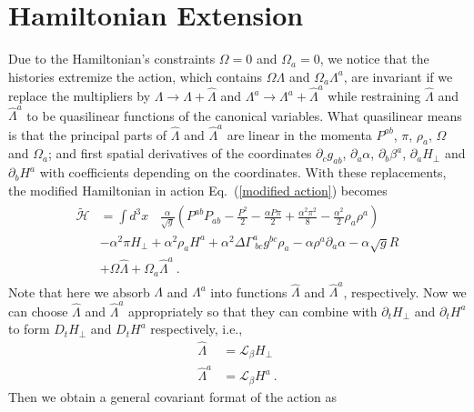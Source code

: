 \section{Hamiltonian Extension}\label{extension}
Due to the Hamiltonian's constraints $\Omega = 0$ and $\Omega_{a} = 0$, we notice that the histories extremize the action, which contains $\Omega \Lambda$ and $\Omega_{a}\Lambda^{a}$, are invariant if we replace the multipliers by $\Lambda \rightarrow \Lambda + {\hat \Lambda}$ and $\Lambda^{a} \rightarrow \Lambda^{a} + {\hat \Lambda}^{a}$ while restraining ${\hat \Lambda}$ and ${\hat \Lambda}^{a}$ to be quasilinear functions of the canonical variables. What quasilinear means is that the principal parts of ${\hat \Lambda}$ and ${\hat \Lambda}^{a}$ are linear in the momenta $P^{ab}$, $\pi$, $\rho_{a}$, $\Omega$ and $\Omega_{a}$; and first spatial derivatives of the coordinates $\partial_{c}g_{ab}$, $\partial_{a}\alpha$, $\partial_{b}\beta^{a}$, $\partial_{a}H_{\perp}$ and $\partial_{b}H^{a}$ with coefficients depending on the coordinates. With these replacements, the modified Hamiltonian in action Eq.~(\ref{modified action}) becomes
\begin{align}
\begin{split}
\tilde{\mathscr{H}} & = \int d^{3}x~~~~\frac{\alpha}{\sqrt{g}}\left(P^{ab}P_{ab} - \frac{P^{2}}{2} - \frac{\alpha P \pi}{2} + \frac{\alpha^{2}\pi^{2}}{8} - \frac{\alpha^{2}}{2}\rho_{a}\rho^{a}\right)\\
& -\alpha^{2}\pi H_{\perp} + \alpha^{2}\rho_{a}H^{a} + \alpha^{2}\Delta\Gamma^{a}_{~bc}g^{bc}\rho_{a} - \alpha \rho^{a}\partial_{a}\alpha - \alpha\sqrt{g}R\\
& + \Omega {\hat \Lambda} + \Omega_{a}{\hat \Lambda}^{a} \ .
\end{split}
\end{align}
Note that here we absorb $\Lambda$ and $\Lambda^{a}$ into functions ${\hat \Lambda}$ and ${\hat \Lambda}^{a}$, respectively. Now we can choose ${\hat \Lambda}$ and ${\hat \Lambda}^{a}$ appropriately so that they can combine with $\partial_{t}H_{\perp}$ and $\partial_{t}H^{a}$ to form $D_{t}H_{\perp}$ and $D_{t}H^{a}$ respectively, i.e., 
\begin{subequations}
\begin{align}
{\hat \Lambda} & = \mathcal{L}_{\beta}H_{\perp}\\
{\hat \Lambda}^{a} & = \mathcal{L}_{\beta}H^{a} \ .
\end{align}
\end{subequations}
Then we obtain a general covariant format of the action as
